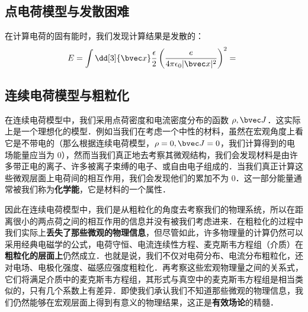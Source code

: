 
\subsection{点电荷模型与发散困难}
在计算电荷的固有能时，我们发现计算结果是发散的：
\begin{equation}\label{elecdb_eq1}
E=\int \dd[3]{\bvec x}\frac{\epsilon}{2} \left(\frac{e}{4\pi\epsilon_0 |\bvec x|^2}\right)^2=\frac{}{}
\end{equation}


\subsection{连续电荷模型与粗粒化}
在连续电荷模型中，我们采用点荷密度和电流密度分布的函数 $\rho,\bvec J$．这实际上是一个理想化的模型．例如当我们在考虑一个中性的材料，虽然在宏观角度上看它是不带电的（那么根据连续电荷模型，$\rho=0,\bvec J=0$，我们计算得到的电场能量应当为 $0$），然而当我们真正地去考察其微观结构，我们会发现材料是由许多带正电的离子、许多被离子束缚的电子、或自由电子组成的．当我们真正计算这些微观层面上电荷间的相互作用，我们会发现他们的累加不为 $0$．这一部分能量通常被我们称为\textbf{化学能}，它是材料的一个属性．

因此在连续电荷模型中，我们是从粗粒化的角度去考察我们的物理系统，所以在距离很小的两点荷之间的相互作用的信息并没有被我们考虑进来．在粗粒化的过程中我们实际上\textbf{丢失了那些微观的物理信息}，但尽管如此，许多物理量的计算仍然可以采用经典电磁学的公式，电荷守恒、电流连续性方程、麦克斯韦方程组（介质）在\textbf{粗粒化的层面上}仍然成立．也就是说，我们不仅对电荷分布、电流分布粗粒化，还对电场、电极化强度、磁感应强度粗粒化．再考察这些宏观物理量之间的关系式，它们将满足介质中的麦克斯韦方程组，其形式与真空中的麦克斯韦方程组是相当类似的，只有几个系数上有差异．即使我们承认我们不知道那些微观的物理信息，我们仍然能够在宏观层面上得到有意义的物理结果，这正是\textbf{有效场论}的精髓．